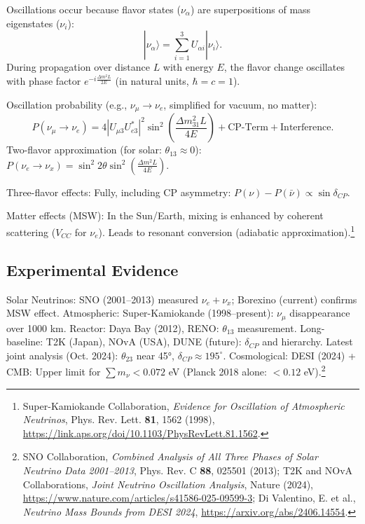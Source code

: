	Oscillations occur because flavor states ($\nu_\alpha$) are superpositions of mass eigenstates ($\nu_i$):
	\begin{equation}
		|\nu_\alpha\rangle = \sum_{i=1}^3 U_{\alpha i} |\nu_i\rangle.
		\label{eq:flavorueberlagerung}
	\end{equation}
	During propagation over distance $L$ with energy $E$, the flavor change oscillates with phase factor $ e^{-i \frac{\Delta m^2 L}{2E}} $ (in natural units, $\hbar=c=1$).
	
	Oscillation probability (e.g., $\nu_\mu \to \nu_e$, simplified for vacuum, no matter):
	\begin{equation}
		P(\nu_\mu \to \nu_e) = 4 |U_{\mu 3} U_{e 3}^*|^2 \sin^2 \left( \frac{\Delta m_{31}^2 L}{4E} \right) + \text{CP-Term} + \text{Interference}.
		\label{eq:oszprob}
	\end{equation}
	Two-flavor approximation (for solar: $\theta_{13}\approx0$): $ P(\nu_e \to \nu_x) = \sin^2 2\theta \sin^2 \left( \frac{\Delta m^2 L}{4E} \right) $.
	
	Three-flavor effects: Fully, including CP asymmetry: $ P(\nu) - P(\bar{\nu}) \propto \sin \delta_{CP} $.
	
	Matter effects (MSW): In the Sun/Earth, mixing is enhanced by coherent scattering ($V_{CC}$ for $\nu_e$). Leads to resonant conversion (adiabatic approximation).\footnote{Super-Kamiokande Collaboration, \emph{Evidence for Oscillation of Atmospheric Neutrinos}, Phys. Rev. Lett. \textbf{81}, 1562 (1998), \url{https://link.aps.org/doi/10.1103/PhysRevLett.81.1562}.}
	
	\subsection{Experimental Evidence}
	
	Solar Neutrinos: SNO (2001--2013) measured $\nu_e + \nu_x$; Borexino (current) confirms MSW effect. Atmospheric: Super-Kamiokande (1998--present): $\nu_\mu$ disappearance over 1000 km. Reactor: Daya Bay (2012), RENO: $\theta_{13}$ measurement. Long-baseline: T2K (Japan), NOvA (USA), DUNE (future): $\delta_{CP}$ and hierarchy. Latest joint analysis (Oct. 2024): $\theta_{23}$ near 45°, $\delta_{CP} \approx 195^\circ$. Cosmological: DESI (2024) + CMB: Upper limit for $\sum m_\nu < 0.072$ eV (Planck 2018 alone: $< 0.12$ eV).\footnote{SNO Collaboration, \emph{Combined Analysis of All Three Phases of Solar Neutrino Data 2001--2013}, Phys. Rev. C \textbf{88}, 025501 (2013); T2K and NOvA Collaborations, \emph{Joint Neutrino Oscillation Analysis}, Nature (2024), \url{https://www.nature.com/articles/s41586-025-09599-3}; Di Valentino, E. et al., \emph{Neutrino Mass Bounds from DESI 2024}, \url{https://arxiv.org/abs/2406.14554}.}
	
